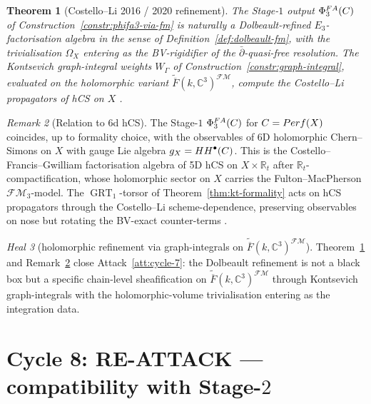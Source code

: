 \documentclass[11pt]{article}
\newtheorem{theorem}{Theorem}[section]
\theoremstyle{definition}
\theoremstyle{remark}
\newtheorem{remark}[theorem]{Remark}
\newtheorem{heal}[theorem]{Heal}
\DeclareMathOperator{\HH}{HH}
\DeclareMathOperator{\GRT}{GRT}
\newcommand{\FMbar}{\overline{F}}
\newcommand{\FM}{\mathcal{FM}}
\newcommand{\PhiFA}{\Phi^{\mathrm{FA}}}
\begin{document}
\begin{theorem}[Costello--Li 2016 / 2020 refinement]
\label{thm:cl-refinement}
The Stage-$1$ output $\PhiFA_3(\cC)$ of Construction~\ref{constr:phifa3-via-fm}
is naturally a Dolbeault-refined $E_3$-factorisation algebra in the
sense of Definition~\ref{def:dolbeault-fm}, with the trivialisation
$\Omega_X$ entering as the BV-rigidifier of the $\bar\partial$-quasi-free
resolution. The Kontsevich graph-integral weights $W_\Gamma$ of
Construction~\ref{constr:graph-integral}, evaluated on the holomorphic
variant $\widetilde{\FMbar}(k, \mathbb{C}^3)^{\FM}$, compute the
Costello--Li propagators of hCS on $X$
\cite[Costello--Li 2020, \S 3]{CostelloLi2020}.
\end{theorem}

\begin{remark}[Relation to 6d hCS]
\label{rem:cy3-6d-hcs}
The Stage-$1$ $\PhiFA_3(\cC)$ for $C = Perf(X)$ coincides,
up to formality choice, with the observables of 6D holomorphic
Chern--Simons on $X$ with gauge Lie algebra $\mathfrak{g}_X =
\HH^\bullet(\cC)$. This is the Costello--Francis--Gwilliam factorisation
algebra of 5D hCS on $X \times \mathbb{R}_t$ after $\mathbb{R}_t$-compactification,
whose holomorphic sector on $X$ carries the Fulton--MacPherson
$\FM_3$-model. The $\GRT_1$-torsor of Theorem~\ref{thm:kt-formality}
acts on hCS propagators through the Costello--Li scheme-dependence,
preserving observables on nose but rotating the BV-exact
counter-terms \cite{CostelloLi2020, CFG2026}.
\end{remark}

\begin{heal}[holomorphic refinement via graph-integrals on $\widetilde{\FMbar}(k, \mathbb{C}^3)^{\FM}$]
\label{heal:cycle-7}
Theorem~\ref{thm:cl-refinement} and Remark~\ref{rem:cy3-6d-hcs} close
Attack~\ref{att:cycle-7}: the Dolbeault refinement is not a black box
but a specific chain-level sheafification on
$\widetilde{\FMbar}(k, \mathbb{C}^3)^{\FM}$ through Kontsevich
graph-integrals with the holomorphic-volume trivialisation entering
as the integration data.
\end{heal}

\section{Cycle 8: RE-ATTACK --- compatibility with Stage-$2$}
\end{document}
